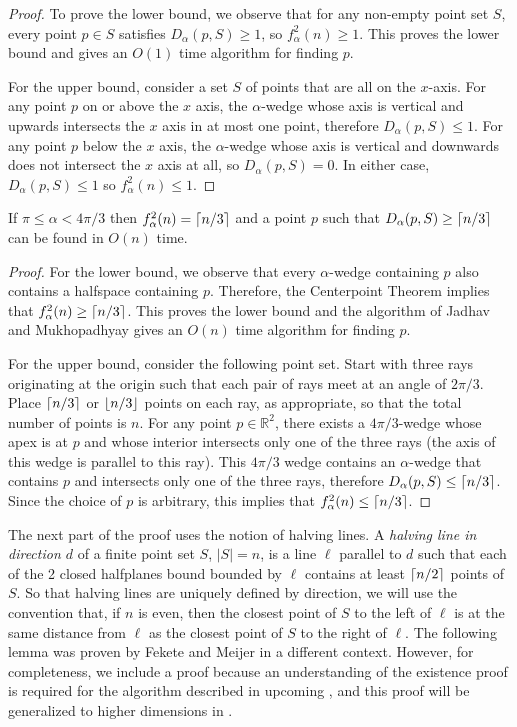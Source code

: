 \documentclass[lotsofwhite]{patmorin}
\begin{document}
\begin{proof}
To prove the lower bound, we observe that for any non-empty
point set $S$, every point $p\in S$ satisfies $D_\alpha(p,S)\ge 1$, so
$f^2_\alpha(n) \ge 1$. This proves the lower bound and gives an $O(1)$
time algorithm for finding $p$. 

For the upper bound, consider a set $S$ of points that are all
on the $x$-axis.  For any point $p$ on or above the $x$ axis, the
$\alpha$-wedge whose axis is vertical and upwards intersects the $x$
axis in at most one point, therefore $D_\alpha(p,S) \le 1$.  For any
point $p$ below the $x$ axis, the $\alpha$-wedge whose axis is
vertical and downwards does not intersect the $x$ axis at all, so
$D_\alpha(p,S)=0$.  In either case, $D_\alpha(p,S)\le 1$ so $f^2_\alpha(n)
\le 1$.
\end{proof}

\begin{lem}
If $\pi\le \alpha < 4\pi/3$ then $f^2_\alpha(n) = \left\lceil n/3 \right\rceil$ and a
point $p$ such that $D_\alpha(p,S)\ge \left\lceil n/3 \right\rceil$ can be found in $O(n)$ time.
\end{lem}

\begin{proof} 
For the lower bound, we observe that every $\alpha$-wedge containing
$p$ also contains a halfspace containing $p$.  Therefore, the
Centerpoint Theorem implies that $f^2_\alpha(n) \ge \left\lceil n/3 \right\rceil$.  This
proves the lower bound and the algorithm of Jadhav and Mukhopadhyay
\cite{jm94} gives an $O(n)$ time algorithm for finding $p$.

For the upper bound, consider the following point set.  Start with
three rays originating at the origin such that each pair of rays meet at an
angle of $2\pi/3$.  Place $\left\lceil n/3 \right\rceil$ or $\left\lfloor n/3 \right\rfloor$ points on each
ray, as appropriate, so that the total number of points is $n$.  For
any point $p\in\mathbb{R}^2$, there exists a $4\pi/3$-wedge whose apex
is at $p$ and whose interior intersects only one of the three rays
(the axis of this wedge is parallel to this ray). This $4\pi/3$ wedge
contains an $\alpha$-wedge that contains $p$ and intersects only one
of the three rays, therefore $D_\alpha(p,S)\le \left\lceil n/3 \right\rceil$.  Since the
choice of $p$ is arbitrary, this implies that $f^2_\alpha(n) \le
\left\lceil n/3 \right\rceil$.  
\end{proof}

The next part of the proof uses the notion of halving lines.  A
\emph{halving line in direction $d$} of a finite point set $S$,
$|S|=n$, is a line $\ell$ parallel to $d$ such that each of the 2
closed halfplanes bound bounded by $\ell$ contains at least
$\left\lceil n/2 \right\rceil$ points of $S$.  So that halving lines are uniquely
defined by direction, we will use the convention that, if $n$ is even,
then the closest point of $S$ to the left of $\ell$ is at the same
distance from $\ell$ as the closest point of $S$ to the right of
$\ell$.  The following lemma was proven by Fekete and Meijer
\cite[Lemma~2]{fm00} in a different context.  However, for
completeness, we include a proof because an understanding of the
existence proof is required for the algorithm described in upcoming
, and this proof will be generalized to higher
dimensions in .
\end{document}
